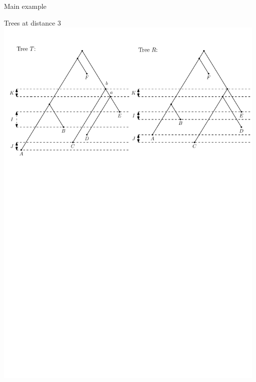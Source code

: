 \documentclass{beamer}
\theoremstyle{example}
\begin{document}
\begin{frame}{Main example}
\begin{block}{Trees at distance $3$}
\includegraphics[width=\framewidth]{dts_neighbors}
\end{block}
\end{frame}
\end{document}
